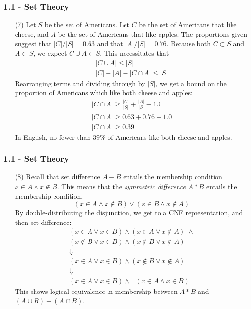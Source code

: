 \documentclass{beamer}
\begin{document}
\begin{frame}
\frametitle{1.1 - Set Theory}
\small
\begin{enumerate}
	\item[(7)] Let $S$ be the set of Americans. Let $C$ be the set of Americans that like cheese, and $A$ be the set of Americans that like apples. The proportions given suggest that $|C|/|S| = 0.63$ and that $|A|/|S| = 0.76$. Because both $C\subset S$ and $A\subset S$, we expect $C\cup A\subset S$. This necessitates that
	\begin{gather*}
	|C\cup A| \leq |S| \\
	|C| + |A| - |C\cap A| \leq |S|
	\end{gather*}
	Rearranging terms and dividing through by $|S|$, we get a bound on the proportion of Americans which like both cheese and apples:
	\begin{gather*}
	|C\cap A| \geq \frac{|C|}{|S|} + \frac{|A|}{|S|} - 1.0 \\
	|C\cap A| \geq 0.63 + 0.76 - 1.0 \\
	|C\cap A| \geq 0.39
	\end{gather*}
	In English, no fewer than $39\%$ of Americans like both cheese and apples.
\end{enumerate}
\end{frame}
\begin{frame}
\frametitle{1.1 - Set Theory}
\small
\begin{enumerate}
	\item[(8)] Recall that set difference $A - B$ entails the membership condition $x\in A \wedge x\notin B$. This means that the \textit{symmetric difference} $A*B$ entails the membership condition,
	\begin{equation*}
	(x\in A \wedge x\notin B)\vee(x\in B\wedge x\notin A)
	\end{equation*}
	By double-distributing the disjunction, we get to a CNF representation, and then set-difference:
	\begin{gather*}
	(x\in A\vee x\in B)\wedge(x\in A\vee x\notin A)\;\wedge \\ (x\notin B\vee x\in B)\wedge(x\notin B\vee x\notin A) \\
	\Downarrow \\ 
	(x\in A\vee x\in B)\wedge(x\notin B\vee x\notin A) \\
	\Downarrow \\
	(x\in A\vee x\in B)\wedge\neg(x\in A\wedge x\in B)
	\end{gather*}
	This shows logical equivalence in membership between $A*B$ and $(A\cup B) - (A\cap B)$.
\end{enumerate}
\end{frame}
\end{document}
